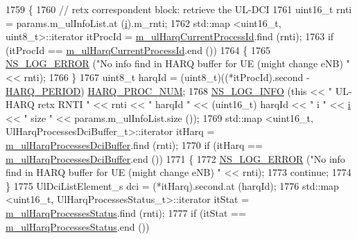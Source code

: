 \begin{DoxyCode}
1759             \{
1760               \textcolor{comment}{// retx correspondent block: retrieve the UL-DCI}
1761               uint16\_t rnti = params.m\_ulInfoList.at (\hyperlink{bernuolliDistribution_8m_a6f6ccfcf58b31cb6412107d9d5281426}{i}).m\_rnti;
1762               std::map <uint16\_t, uint8\_t>::iterator itProcId = 
      \hyperlink{classns3_1_1FdTbfqFfMacScheduler_a36b22976070611aa3fdd5c573f891dc2}{m\_ulHarqCurrentProcessId}.find (rnti);
1763               \textcolor{keywordflow}{if} (itProcId == \hyperlink{classns3_1_1FdTbfqFfMacScheduler_a36b22976070611aa3fdd5c573f891dc2}{m\_ulHarqCurrentProcessId}.end ())
1764                 \{
1765                   \hyperlink{group__logging_ga0261a8db1d4ac5f79417d117634fd455}{NS\_LOG\_ERROR} (\textcolor{stringliteral}{"No info find in HARQ buffer for UE (might change eNB) "} << 
      rnti);
1766                 \}
1767               uint8\_t harqId = (uint8\_t)((*itProcId).second - \hyperlink{lte-common_8h_a275321ee206f130c3ddc81fcdaa13cfd}{HARQ\_PERIOD}) %
      \hyperlink{cqa-ff-mac-scheduler_8h_a9185d8d7d2b2979181d4a7044a3d3555}{HARQ\_PROC\_NUM};
1768               \hyperlink{group__logging_gafbd73ee2cf9f26b319f49086d8e860fb}{NS\_LOG\_INFO} (\textcolor{keyword}{this} << \textcolor{stringliteral}{" UL-HARQ retx RNTI "} << rnti << \textcolor{stringliteral}{" harqId "} << (uint16\_t)
      harqId << \textcolor{stringliteral}{" i "} << \hyperlink{bernuolliDistribution_8m_a6f6ccfcf58b31cb6412107d9d5281426}{i} << \textcolor{stringliteral}{" size "}  << params.m\_ulInfoList.size ());
1769               std::map <uint16\_t, UlHarqProcessesDciBuffer\_t>::iterator itHarq = 
      \hyperlink{classns3_1_1FdTbfqFfMacScheduler_a8566c4093902c1a4c227fa795fa90756}{m\_ulHarqProcessesDciBuffer}.find (rnti);
1770               \textcolor{keywordflow}{if} (itHarq == \hyperlink{classns3_1_1FdTbfqFfMacScheduler_a8566c4093902c1a4c227fa795fa90756}{m\_ulHarqProcessesDciBuffer}.end ())
1771                 \{
1772                   \hyperlink{group__logging_ga0261a8db1d4ac5f79417d117634fd455}{NS\_LOG\_ERROR} (\textcolor{stringliteral}{"No info find in HARQ buffer for UE (might change eNB) "} << 
      rnti);
1773                   \textcolor{keywordflow}{continue};
1774                 \}
1775               UlDciListElement\_s dci = (*itHarq).second.at (harqId);
1776               std::map <uint16\_t, UlHarqProcessesStatus\_t>::iterator itStat = 
      \hyperlink{classns3_1_1FdTbfqFfMacScheduler_aa02927d2f9ea374d54c0fff160b5dbbc}{m\_ulHarqProcessesStatus}.find (rnti);
1777               \textcolor{keywordflow}{if} (itStat == \hyperlink{classns3_1_1FdTbfqFfMacScheduler_aa02927d2f9ea374d54c0fff160b5dbbc}{m\_ulHarqProcessesStatus}.end ())

\end{DoxyCode}
